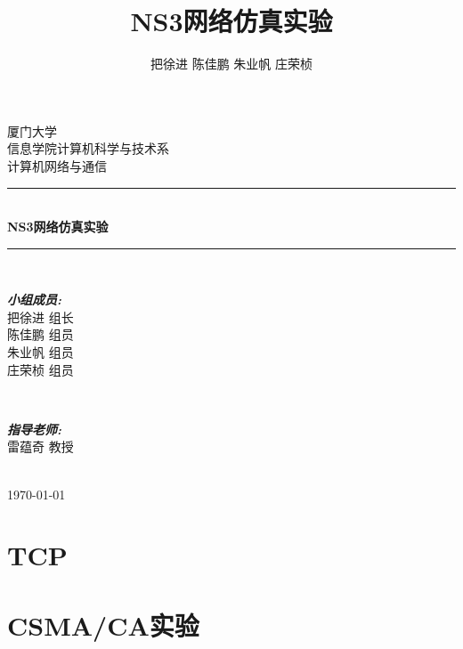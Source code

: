\documentclass{article}
\title{\heiti NS3网络仿真实验}
\author{\kaishu 把徐进 陈佳鹏 朱业帆 庄荣桢}
\date{}
\begin{document}
 
	
\begin{titlepage}
	
	\newcommand{\HRule}{\rule{\linewidth}{0.5mm}} %
	
	\center %
	
	\textsc{\LARGE 厦门大学}\\[1.5cm]
	\textsc{\Large 信息学院计算机科学与技术系}\\[0.5cm]
	\textsc{\large 计算机网络与通信}\\[0.5cm]
	
	\HRule \\[0.4cm]
	{ \huge \bfseries NS3网络仿真实验}\\[0.4cm] %
	\HRule \\[1.5cm]
	
	\begin{minipage}{0.5\textwidth}
		\begin{flushleft} \large
			\emph{\textbf{小组成员:}}\\
			把徐进 \textsc{组长} \\
			陈佳鹏 \textsc{组员} \\
			朱业帆 \textsc{组员} \\
			庄荣桢 \textsc{组员} \\
		\end{flushleft}
	\end{minipage}
	~
	\begin{minipage}{0.4\textwidth}
		\begin{flushright} \large
			\emph{\textbf{指导老师:}} \\
			雷蕴奇 \textsc{教授}
		\end{flushright}
	\end{minipage}\\[2cm]
	
	{\large \today}\\[2cm]
	
	\vfill %
	
\end{titlepage}


\newpage
\tableofcontents
\newpage
\section{TCP}
\section{CSMA/CA实验}
\end{document}
